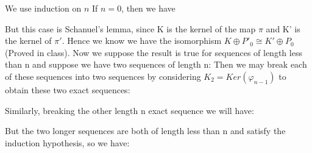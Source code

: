 \documentclass{article}
\begin{document}
We use induction on $n$ If $n=0$, then we have
\begin{center}
\newline
{}
\newline
\end{center}
But this case is Schanuel's lemma, since K is the kernel of the map $\pi$ and K' is the kernel of $\pi'$.  Hence we know we have the isomorphism $K\oplus P'_0 \cong K' \oplus P_0$ (Proved in class).
\newline
\newline
Now we suppose the result is true for sequences of length less than n and suppose we have two sequences of length n:
\newline
\newline
Then we may break each of these sequences into two sequences by considering $K_2= Ker(\varphi_{n-1})$ to obtain these two exact sequences:
\newline
{}
\newline
{}
\newline
Similarly, breaking the other length n exact sequence we will have:
\newline
{}
\newline
{}
\newline
But the two longer sequences are both of length less than n and satisfy the induction hypothesis, so we have: \newline
\end{document}
